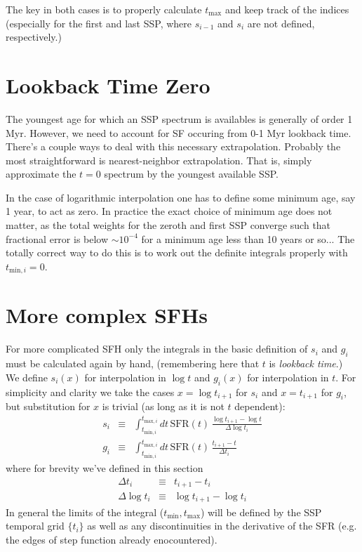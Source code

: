\documentclass[12pt, letterpaper, preprint]{aastex}
\newcommand{\tmin}[1][]{t_{\mathrm{min} #1}}
\newcommand{\tmax}[1][]{t_{\mathrm{max} #1}}
\newcommand{\dlt}{\Delta\log t_i}
\newcommand{\dt}{\Delta t_i}
\newcommand{\tintegral}{\int_{\tmin[,i]}^{\tmax[,i]} dt}
\begin{document}
The key in both cases is to properly calculate $\tmax$ and keep track of the indices 
(especially for the first and last SSP, where $s_{i-1}$ and $s_i$ are not defined, respectively.)  

\section{Lookback Time Zero}
The youngest age for which an SSP spectrum is availables is generally of order 1 Myr.  
However, we need to account for SF occuring from 0-1 Myr lookback time.
There's a couple ways to deal with this necessary extrapolation.
Probably the most straightforward is nearest-neighbor extrapolation.  
That is, simply approximate the $t=0$ spectrum by the youngest available SSP.

In the case of logarithmic interpolation one has to define some minimum age, say 1 year, to act as zero.
In practice the exact choice of minimum age does not matter, 
as the total weights for the zeroth and first SSP converge such that fractional error is below $\sim 10^{-4}$ for a minimum age less than 10 years or so...
The totally correct way to do this is to work out the definite integrals properly with $\tmin[,i]=0$.


\section{More complex SFHs}
For more complicated SFH only the integrals in the basic definition of $s_i$ and $g_i$ must be calculated again by hand, 
(remembering here that $t$ is \emph{lookback time}.)
We define $s_i(x)$ for interpolation in $\log t$ and $g_i(x)$ for interpolation in $t$.  
For simplicity and clarity we take the cases $x = \log t_{i+1}$ for $s_i$ and $x = t_{i+1}$ for $g_i$, 
but substitution for $x$ is trivial (as long as it is not $t$ dependent):
\begin{eqnarray}
s_i & \equiv & \tintegral \, \mathrm{SFR}(t) \, \frac{\log t_{i+1} - \log t}{\dlt} \\
g_i & \equiv & \tintegral \, \mathrm{SFR}(t) \, \frac{t_{i+1} - t}{\dt}
\end{eqnarray}
where for brevity we've defined in this section
\begin{eqnarray}
\dt & \equiv & t_{i+1} -  t_i  \nonumber \\
\dlt & \equiv & \log t_{i+1} - \log t_i \nonumber
\end{eqnarray}
In general the limits of the integral ($\tmin, \tmax$) will be defined by the SSP temporal grid $\{t_i\}$ as well as any discontinuities in the derivative of the SFR (e.g. the edges of step function already enocountered).
\end{document}
